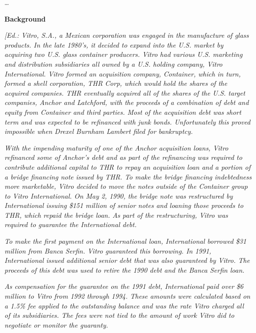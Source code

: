 \begin{select}
\ldots
\begin{center} \textbf{Background}
\end{center}

\textit{[Ed.: Vitro, S.A., a Mexican corporation was engaged in the manufacture of glass products.  In the late 1980's, it decided to expand into the U.S. market by acquiring two U.S. glass container producers.  Vitro had various U.S. marketing and distribution subsidiaries all owned by a U.S. holding company, Vitro International.  Vitro formed an acquisition  company, Container, which in turn, formed a shell corporation, THR Corp, which would hold the shares of the acquired companies.  THR eventually acquired all of the shares of the U.S. target companies, Anchor and Latchford, with the proceeds of a combination of debt and equity from Container and third parties.  Most of the acquisition debt was short term and was expected to be refinanced with junk bonds.  Unfortunately  this proved impossible when Drexel Burnham Lambert filed for bankruptcy.}

\textit{With the impending maturity of one of the Anchor acquisition loans, Vitro refinanced some of Anchor's debt and as part of the refinancing was required to contribute additional capital to THR to repay an acquisition loan and a portion of a bridge financing note issued by THR.  To make the bridge financing indebtedness more marketable, Vitro decided to move the notes outside of the Container group to Vitro International.  On May 2, 1990, the bridge note was restructured by International issuing \$151 million of senior notes and loaning those proceeds to THR, which repaid the bridge loan.  As part of the restructuring, Vitro was required to guarantee the International debt.}

\textit{To make the first payment on the International loan, International borrowed \$31 million from Banca Serfin.  Vitro guaranteed this borrowing.  In 1991, International issued additional senior debt that was also guaranteed by Vitro.  The proceeds of this debt was used to retire the 1990 debt and the Banca Serfin loan.}

\textit{As compensation for the guarantee on the 1991 debt, International paid over \$6 million to Vitro from 1992 through 1994.  These amounts were calculated based on a 1.5\% fee applied to the outstanding balance and was the rate Vitro charged all of its subsidiaries.  The fees were not tied to the amount of work Vitro did to negotiate or monitor the guaranty. }


\end{select}
